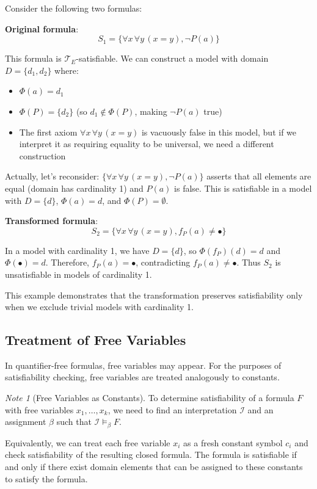 \documentclass[11pt,a4paper]{article}
\theoremstyle{definition}
\theoremstyle{plain}
\theoremstyle{remark}
\newtheorem*{remark}{Note}
\begin{document}
Consider the following two formulas:

\textbf{Original formula}:
\[
S_1 = \{\forall x \, \forall y \, (x = y), \neg P(a)\}
\]

This formula is $\mathcal{T}_E$-satisfiable. We can construct a model with domain $D = \{d_1, d_2\}$ where:
\begin{itemize}
    \item $\Phi(a) = d_1$
    \item $\Phi(P) = \{d_2\}$ (so $d_1 \notin \Phi(P)$, making $\neg P(a)$ true)
    \item The first axiom $\forall x \, \forall y \, (x = y)$ is vacuously false in this model, but if we interpret it as requiring equality to be universal, we need a different construction
\end{itemize}

Actually, let's reconsider: $\{\forall x \, \forall y \, (x = y), \neg P(a)\}$ asserts that all elements are equal (domain has cardinality 1) and $P(a)$ is false. This is satisfiable in a model with $D = \{d\}$, $\Phi(a) = d$, and $\Phi(P) = \emptyset$.

\textbf{Transformed formula}:
\[
S_2 = \{\forall x \, \forall y \, (x = y), f_P(a) \neq \bullet\}
\]

In a model with cardinality 1, we have $D = \{d\}$, so $\Phi(f_P)(d) = d$ and $\Phi(\bullet) = d$. Therefore, $f_P(a) = \bullet$, contradicting $f_P(a) \neq \bullet$. Thus $S_2$ is unsatisfiable in models of cardinality 1.

This example demonstrates that the transformation preserves satisfiability only when we exclude trivial models with cardinality 1.

\subsection{Treatment of Free Variables}

In quantifier-free formulas, free variables may appear. For the purposes of satisfiability checking, free variables are treated analogously to constants.

\begin{remark}[Free Variables as Constants]
To determine satisfiability of a formula $F$ with free variables $x_1, \dots, x_k$, we need to find an interpretation $\mathcal{I}$ and an assignment $\beta$ such that $\mathcal{I} \models_\beta F$.

Equivalently, we can treat each free variable $x_i$ as a fresh constant symbol $c_i$ and check satisfiability of the resulting closed formula. The formula is satisfiable if and only if there exist domain elements that can be assigned to these constants to satisfy the formula.
\end{remark}
\end{document}
